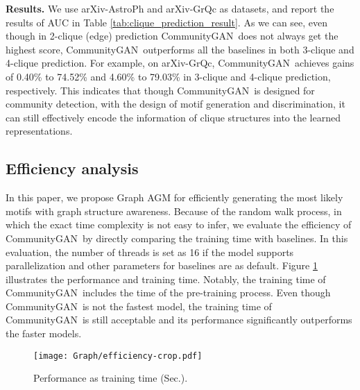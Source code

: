 \documentclass[sigconf]{acmart}
\newcommand{\ComGAN}{CommunityGAN}
\begin{document}
\vspace{5pt}\noindent\textbf{Results.}
We use arXiv-AstroPh and arXiv-GrQc as datasets, and report the results of AUC in Table \ref{tab:clique_prediction_result}.
As we can see, even though in 2-clique (edge) prediction \ComGAN~does not always get the highest score, \ComGAN~outperforms all the baselines in both 3-clique and 4-clique prediction.
For example, on arXiv-GrQc, \ComGAN~achieves gains of 0.40\% to 74.52\% and 4.60\% to 79.03\% in 3-clique and 4-clique prediction, respectively.
This indicates that though \ComGAN~is designed for community detection, with the design of motif generation and discrimination, it can still effectively encode the information of clique structures into the learned representations.

\subsection{Efficiency analysis}
\label{efficiency-analysis}
In this paper, we propose Graph AGM for efficiently generating the most likely motifs with graph structure awareness.
Because of the random walk process, in which the exact time complexity is not easy to infer, we evaluate the efficiency of \ComGAN~by directly comparing the training time with baselines.
In this evaluation, the number of threads is set as 16 if the model supports parallelization and other parameters for baselines are as default.
Figure \ref{fig:efficiency} illustrates the performance and training time.
Notably, the training time of \ComGAN~includes the time of the pre-training process.
Even though \ComGAN~is not the fastest model, the training time of \ComGAN~is still acceptable and its performance significantly outperforms the faster models.

\begin{figure}[tbp]
\texttt{[image: Graph/efficiency-crop.pdf]}
\caption{Performance as training time (Sec.).}
\label{fig:efficiency}
\end{figure}
\end{document}
